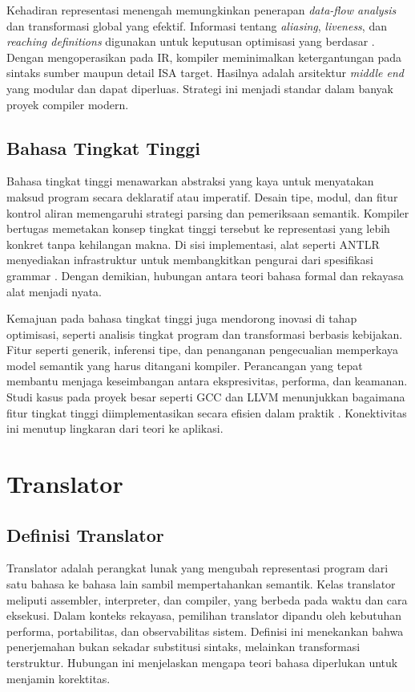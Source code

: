 \documentclass[../main.tex]{subfiles}
\begin{document}
Kehadiran representasi menengah memungkinkan penerapan \emph{data-flow analysis} dan transformasi global yang efektif. Informasi tentang \emph{aliasing}, \emph{liveness}, dan \emph{reaching definitions} digunakan untuk keputusan optimisasi yang berdasar \citep{WikiDataFlow,WikiLiveVariables,WikiReachingDef}. Dengan mengoperasikan pada IR, kompiler meminimalkan ketergantungan pada sintaks sumber maupun detail ISA target. Hasilnya adalah arsitektur \emph{middle end} yang modular dan dapat diperluas. Strategi ini menjadi standar dalam banyak proyek compiler modern.

\subsection{Bahasa Tingkat Tinggi}
Bahasa tingkat tinggi menawarkan abstraksi yang kaya untuk menyatakan maksud program secara deklaratif atau imperatif. Desain tipe, modul, dan fitur kontrol aliran memengaruhi strategi parsing dan pemeriksaan semantik. Kompiler bertugas memetakan konsep tingkat tinggi tersebut ke representasi yang lebih konkret tanpa kehilangan makna. Di sisi implementasi, alat seperti ANTLR menyediakan infrastruktur untuk membangkitkan pengurai dari spesifikasi grammar \citep{ANTLRDocs}. Dengan demikian, hubungan antara teori bahasa formal dan rekayasa alat menjadi nyata.

Kemajuan pada bahasa tingkat tinggi juga mendorong inovasi di tahap optimisasi, seperti analisis tingkat program dan transformasi berbasis kebijakan. Fitur seperti generik, inferensi tipe, dan penanganan pengecualian memperkaya model semantik yang harus ditangani kompiler. Perancangan yang tepat membantu menjaga keseimbangan antara ekspresivitas, performa, dan keamanan. Studi kasus pada proyek besar seperti GCC dan LLVM menunjukkan bagaimana fitur tingkat tinggi diimplementasikan secara efisien dalam praktik \citep{GCCInternals,LLVMOverview}. Konektivitas ini menutup lingkaran dari teori ke aplikasi.

\section{Translator}
\subsection{Definisi Translator}
Translator adalah perangkat lunak yang mengubah representasi program dari satu bahasa ke bahasa lain sambil mempertahankan semantik. Kelas translator meliputi assembler, interpreter, dan compiler, yang berbeda pada waktu dan cara eksekusi. Dalam konteks rekayasa, pemilihan translator dipandu oleh kebutuhan performa, portabilitas, dan observabilitas sistem. Definisi ini menekankan bahwa penerjemahan bukan sekadar substitusi sintaks, melainkan transformasi terstruktur. Hubungan ini menjelaskan mengapa teori bahasa diperlukan untuk menjamin korektitas.
\end{document}
